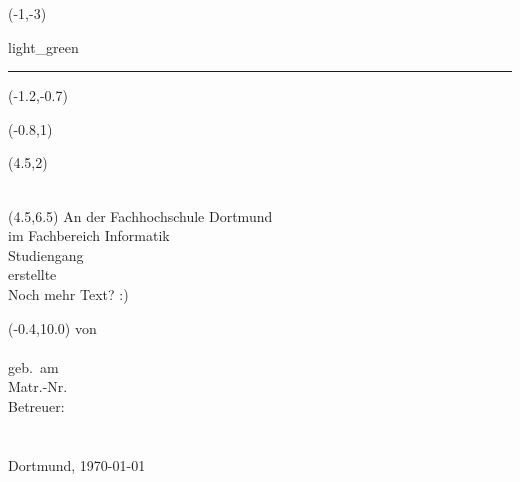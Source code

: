 
\begin{titlepage}
		
  \begin{textblock}{6.5}(-1,-3)
    \begin{color}{light_green}
      \rule{6.8cm}{33cm}    
    \end{color}
  \end{textblock}
  \begin{textblock}{6.5}(-1.2,-0.7)
  \end{textblock}
  \begin{textblock}{6.5}(-0.8,1)
    {\Large \textsf{\thedockind}}            
  \end{textblock}

  \begin{textblock}{8}(4.5,2)
    {\noindent \huge 
      \textsf{\textbf{\thetitle\\[0.3cm] 
          \Large  \thesubtitle\\[0.05cm]
          }} }
  \end{textblock}


  \begin{textblock}{6}(4.5,6.5)\noindent
    \textsf{An der Fachhochschule Dortmund\\
    im Fachbereich Informatik\\
    Studiengang \themajor \\
    erstellte \thedockind \\
    Noch mehr Text? :) \\
    \thedegree}
  \end{textblock}

  \begin{textblock}{6.5}(-0.4,10.0)
    \noindent
    \textsf{von \\
      \theauthor \\
      geb.\ am \thebirthday  \\
      Matr.-Nr. \thematriculationnumber\\[0.7cm]
      Betreuer:\\
       \noindent\hspace*{6mm} \thebetreuer \\
       \noindent\hspace*{6mm} \thezweitbetreuer\\ [0.5cm]
      Dortmund, \today}    
  \end{textblock}
	

\end{titlepage}



